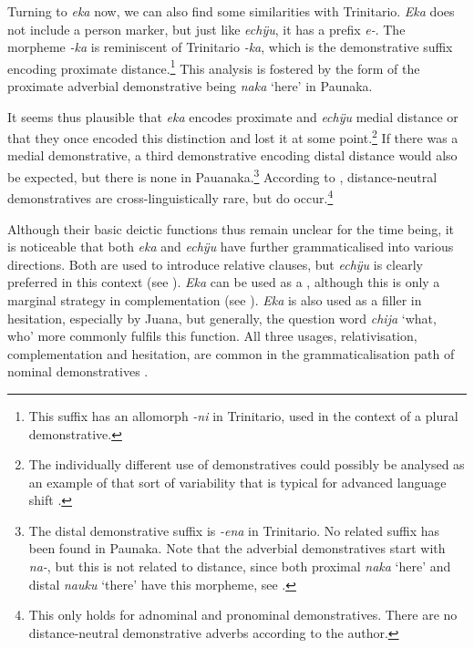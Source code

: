Turning to \textit{eka} now, we can also find some similarities with Trinitario. \textit{Eka} does not include a person marker, but just like \textit{echÿu}, it has a prefix \textit{e-}. The morpheme \textit{-ka} is reminiscent of Trinitario \textit{-ka}, which is the demonstrative suffix encoding proximate distance.\footnote{This suffix has an allomorph \textit{-ni} in Trinitario, used in the context of a plural demonstrative.} This analysis is fostered by the form of the proximate adverbial demonstrative being \textit{naka} ‘here’ in Paunaka.

It seems thus plausible that \textit{eka} encodes proximate and \textit{echÿu} medial distance or that they once encoded this distinction and lost it at some point.\footnote{The individually different use of demonstratives could possibly be analysed as an example of that sort of variability that is typical for advanced language shift \citep[cf.][111--112]{PalosaariCampbell2011}.}  If there was a medial demonstrative, a third demonstrative encoding distal distance would also be expected, but there is none in Pauanaka.\footnote{The distal demonstrative suffix is \textit{-ena} in Trinitario. No related suffix has been found in Paunaka. Note that the adverbial demonstratives start with \textit{na-}, but this is not related to distance, since both proximal \textit{naka} ‘here’ and distal \textit{nauku} ‘there’ have this morpheme, see .} According to \citet[38]{Diessel1999}, distance-neutral demonstratives are cross-linguistically rare, but do occur.\footnote{This only holds for adnominal and pronominal demonstratives. There are no distance-neutral demonstrative adverbs according to the author.}  
 
Although their basic deictic functions thus remain unclear for the time being, it is noticeable that both \textit{eka} and \textit{echÿu} have further grammaticalised into various directions. Both are used to introduce relative clauses, but \textit{echÿu} is clearly preferred in this context (see ). \textit{Eka} can be used as a , although this is only a marginal strategy in complementation (see ). \textit{Eka} is also used as a filler in hesitation, especially by Juana, but generally, the question word \textit{chija} ‘what, who’ more commonly fulfils this function. All three usages, relativisation, complementation and hesitation, are common in the grammaticalisation path of nominal demonstratives \citep[cf.][ch. 6]{Diessel1999}.

